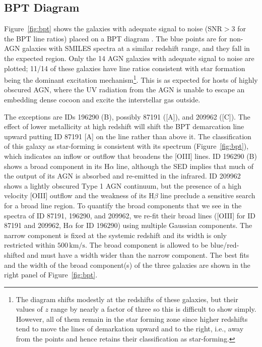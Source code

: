 \documentclass[twocolumn]{aastex63}
\begin{document}
\subsection{BPT Diagram}

Figure~\ref{fig:bpt} shows the galaxies with adequate signal to noise  (SNR$>$3 for  the BPT line ratios) placed on a BPT diagram . The blue points are for non-AGN galaxies with SMILES spectra at a similar redshift range, and they fall in the expected region. Only the 14 AGN galaxies with adequate signal to noise are plotted;  11/14 of these galaxies  have line ratios consistent with star formation being the dominant excitation mechanism\footnote{The diagram shifts modestly at the redshifts of these galaxies, but their values of $z$ range by nearly a factor of three so this is difficult to show simply. However,  all of them remain in the star forming zone since higher redshifts tend to move the lines of demarkation upward and to the right, i.e., away from the points and hence retains their classification as star-forming.}. This is as expected for hosts of highly obscured AGN, where the UV radiation from the AGN is unable to escape  an embedding dense cocoon and excite the interstellar gas outside. 

The exceptions are IDs 196290 (B), possibly 87191 ([A]), and 209962 ([C]). The effect of lower metallicity at high redshift will shift the BPT demarcation line upward putting ID 87191 [A] on the line rather than above it. The classification of this galaxy as star-forming is consistent with its spectrum (Figure~\ref{fig:bpt}), which indicates an inflow or outflow that broadens the [OIII] lines. ID 196290 (B) shows a broad component in its H$\alpha$ line, although the SED implies that much of the output of its AGN is absorbed and re-emitted in the infrared. ID 209962 shows a lightly obscured Type 1 AGN continuum, but the presence of a high velocity [OIII] outflow and the weakness of its H$\beta$ line preclude a sensitive search for a broad line region. 
 To quantify the broad components that we see in the spectra of ID 87191, 196290, and 209962, we re-fit their broad lines ([OIII] for ID 87191 and 209962, H$\alpha$ for ID 196290) using multiple Gaussian components. The narrow component is fixed at the systemic redshift and its width is only restricted within $500\,\mathrm{km/s}$. The broad component is allowed to be blue/red-shifted and must have a width wider than the narrow component. The best fits and the width of the broad component(s) of the three galaxies are shown in the right panel of Figure~\ref{fig:bpt}.
\end{document}
